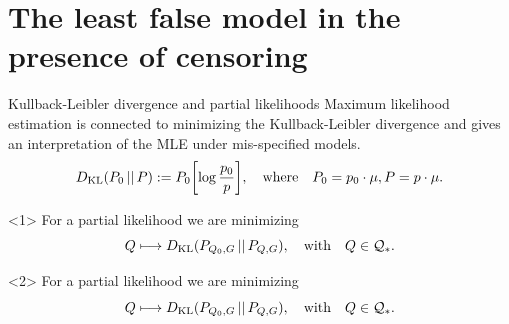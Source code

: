\documentclass[smaller]{beamer}\usepackage{listings}
\begin{document}
\section{The least false model in the presence of censoring}
\label{sec:org1ccc6a0}
\begin{frame}[label={sec:orgc7dccd3}]{Kullback-Leibler divergence and partial likelihoods}
\small Maximum likelihood estimation is connected to minimizing the Kullback-Leibler
divergence and gives an interpretation of the MLE under mis-specified models.
\begin{equation*}
  D_{\mathrm{KL}}(P_0 \, || \, P) := P_0
  {\left[
    \log \frac{p_0}{p}
  \right]},
  \quad \text{where} \quad
  P_0 = p_0 \cdot \mu,   P = p \cdot \mu.
\end{equation*}

\begin{onlyenv}<1>
\color{white}For a partial likelihood we are minimizing
\begin{equation*}
  Q \longmapsto D_{\mathrm{KL}}(P_{Q_0,G} \, || \, P_{Q,G}),
  \quad \text{with} \quad Q \in \mathcal{Q}_*.
\end{equation*}
\color{black}

\vfill

\end{onlyenv}

\begin{onlyenv}<2>
For a partial likelihood we are minimizing
\begin{equation*}
  Q \longmapsto D_{\mathrm{KL}}(P_{Q_0,G} \, || \, P_{Q,G}),
  \quad \text{with} \quad Q \in \mathcal{Q}_*.
\end{equation*}
\color{black}

\vfill

\end{onlyenv}


\end{frame}
\end{document}
